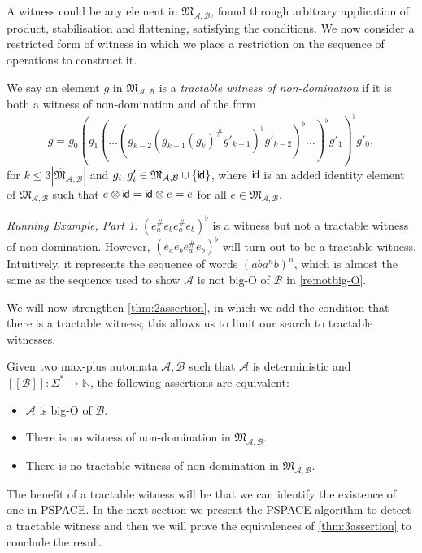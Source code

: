 \documentclass{lmcs}
\theoremstyle{remark}
\newcommand{\N}{\mathbb{N}}
\newcommand{\ideal}{\mathfrak{M}}
\newcommand{\autA}{\mathcal{A}}
\newcommand{\autB}{\mathcal{B}}
\newcommand{\brfunc}[1]{[\![#1]\!]}
\newcommand{\funcB}{\brfunc{\autB}}
\newcommand{\monoidid}{\mathsf{i\kern-0.8pt d}}
\theoremstyle{remark}
\newtheorem{runningexample/}{Running Example, Part}
\newenvironment{runningexample}
  {\renewcommand{\qedsymbol}{\color{darkgray}\ensuremath{\lrcorner}}%
   \pushQED{\qed}\begin{runningexample/}}
  {\popQED\end{runningexample/}}
\begin{document}
A witness could be any element in $\ideal_{\autA,\autB}$, found through arbitrary application of product, stabilisation and flattening, satisfying the conditions. We now consider a restricted form of witness in which we place a restriction on the sequence of operations to construct it. 
\begin{defi}\label{def:tractable_witness}
We say an element $g$ in $\ideal_{\autA,\autB}$ is a \emph{tractable witness of non-domination} if it is both a witness of non-domination and of the form \[g = g_0 (g_1 (\dots (g_{k-2} ( g_{k-1} (g_{k})^\#g'_{k-1})^\flat g'_{k-2})^\flat \dots)^\flat g'_{1})^\flat g'_{0},\] for $k \le 3|\overline{\ideal}_{\autA,\autB}|$ and $g_i, g'_i \in \overline{\ideal}_{\autA,\autB}\cup\{\monoidid\}$, where $\monoidid$ is an added identity element of $\ideal_{\autA,\autB}$ such that $e\otimes \monoidid = \monoidid \otimes e = e$ for all $e\in \ideal_{\autA,\autB}$.
\end{defi}
\begin{runningexample}\label{re:actualtractablewitness}
$(e_a^\#e_be_a^\#e_b)^\flat$ is a witness but not a tractable witness of non-domination. However, $(e_ae_be_a^\#e_b)^\flat$ will turn out to be a tractable witness. Intuitively, it represents the sequence of words $(aba^nb)^n$, which is almost the same as the sequence used to show $\autA$ is not big-O of $\autB$ in \cref{re:notbig-O}.
\end{runningexample}

We will now strengthen \cref{thm:2assertion}, in which we add the condition that there is a tractable witness;  this allows us to limit our search to tractable witnesses.
\begin{thm}\label{thm:3assertion}
Given two max-plus automata $\autA,\autB$ such that $\autA$ is deterministic and $\funcB:\Sigma^* \to \N$, the following assertions are equivalent:
\begin{itemize}
\item $\autA$ is big-O of $\autB$.
\item There is no witness of non-domination in $\ideal_{\autA,\autB}$.
\item There is no tractable witness of non-domination in $\ideal_{\autA,\autB}$.
\end{itemize}
\end{thm}
The benefit of a tractable witness will be that we can identify the existence of one in PSPACE. In the next section we present the PSPACE algorithm to detect a tractable witness and then we will prove the equivalences of \cref{thm:3assertion} to conclude the result.
\end{document}
